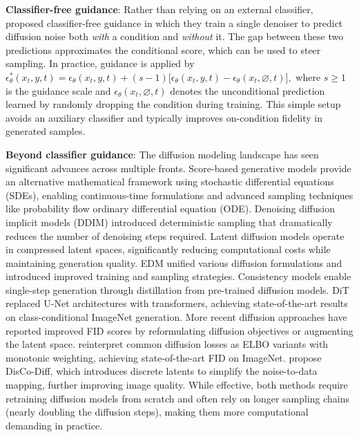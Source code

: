 \documentclass{article}
\begin{document}
\textbf{Classifier-free guidance}: Rather than relying on an external classifier, \cite{ho2022classifier} proposed classifier-free guidance in which they train a single denoiser to predict diffusion noise both \emph{with} a condition and \emph{without} it. The gap between these two predictions approximates the conditional score, which can be used to steer sampling. In practice, guidance is applied by 
$
\epsilon^{*}_{\theta}(x_t,y,t)
= \epsilon_{\theta}(x_t,y,t)
+ (s-1)\Big[\epsilon_{\theta}(x_t,y,t)-\epsilon_{\theta}(x_t,\varnothing,t)\Big],
$ 
where \(s\!\ge\!1\) is the guidance scale and \(\epsilon_{\theta}(x_t,\varnothing,t)\) denotes the unconditional prediction learned by randomly dropping the condition during training. This simple setup avoids an auxiliary classifier and typically improves on-condition fidelity in generated samples.




\textbf{Beyond classifier guidance}: The diffusion modeling landscape has seen significant advances across multiple fronts. Score-based generative models \cite{song2020score} provide an alternative mathematical framework using stochastic differential equations (SDEs), enabling continuous-time formulations and advanced sampling techniques like probability flow ordinary differential equation (ODE). Denoising diffusion implicit models (DDIM) \cite{song2020denoising} introduced deterministic sampling that dramatically reduces the number of denoising steps required. Latent diffusion models \cite{rombach2022high} operate in compressed latent spaces, significantly reducing computational costs while maintaining generation quality. EDM \cite{karras2022elucidating} unified various diffusion formulations and introduced improved training and sampling strategies. Consistency models \cite{song2023consistency} enable single-step generation through distillation from pre-trained diffusion models. DiT \cite{peebles2023scalable} replaced U-Net architectures with transformers, achieving state-of-the-art results on class-conditional ImageNet generation. More recent diffusion approaches have reported improved FID scores by reformulating diffusion objectives or augmenting the latent space. \citet{kingma2023understanding} reinterpret common diffusion losses as ELBO variants with monotonic weighting, achieving state-of-the-art FID on ImageNet. \citet{xu2024disco} propose DisCo-Diff, which introduces discrete latents to simplify the noise-to-data mapping, further improving image quality. While effective, both methods require retraining diffusion models from scratch and often rely on longer sampling chains (nearly doubling the diffusion steps), making them more computational demanding in practice.
\end{document}
